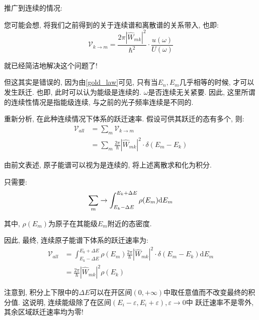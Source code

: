\documentclass[a4paper, 11pt]{article}
\begin{document}
\begin{spacing}{1.2}
          推广到连续的情况:
          \par
          您可能会想, 将我们之前得到的关于连续谱和离散谱的关系带入, 也即:
          \begin{equation}
            \mathcal{V}_{k\to{}m} = \frac{2\pi|\hat{W}_{mk}|^2}{\hbar^2}\cdot\frac{u(\omega)}{U(\omega)}
          \end{equation}
          
          就已经简洁地解决这个问题了!

          但这其实是错误的, 因为由\eqref{gold_law}可见, 只有当$E_n, E_m$几乎相等的时候, 才可以发生跃迁.
          也即, 此时可以认为能级是连续的. $\omega$是否连续无关紧要. 因此, 这里所谓的连续性情况是指能级连续, 
          与之前的光子频率连续是不同的.

          重新分析, 在此种连续情况下体系的跃迁速率.
          假设可供其跃迁的态有多个, 则:
          \begin{equation}
            \begin{aligned}
              \mathcal{V}_{all} &= \sum_m \mathcal{V}_{k\to{}m}\\
                                &= \sum_m \frac{2\pi}{\hbar}|\hat{W}_{mk}|^2\cdot\delta(E_m-E_k)
            \end{aligned} 
          \end{equation}

          由前文表述, 原子能谱可以视为是连续的, 将上述离散求和化为积分.
          \par
          只需要:
          \begin{equation}
            \sum_m \to \int_{E_k-\Delta{}E}^{E_k+\Delta{}E}\rho(E_m)\mathrm{d}E_m\notag
          \end{equation}

          其中, $\rho(E_m)$为原子在其能级$E_m$附近的态密度.

          因此, 最终, 连续原子能谱下体系的跃迁速率为:
          \begin{equation}
            \begin{aligned}
              \mathcal{V}_{all} &= \int_{E_k-\Delta{}E}^{E_k+\Delta{}E}\rho(E_m)
              \frac{2\pi}{\hbar}|\hat{W}_{mk}|^2\cdot\delta(E_m-E_k)\mathrm{d}E_m\\
                                &= \frac{2\pi}{\hbar}|\hat{W}_{mk}|^2\rho(E_k)
            \end{aligned}
          \end{equation}

          注意到, 积分上下限中的$\Delta{}E$可以在开区间$(0, +\infty)$中取任意值而不改变最终的积分值.
          这说明, 连续能级除了在区间$(E_i-\varepsilon, E_i+\varepsilon), \varepsilon\to0$中
          跃迁速率不是零外, 其余区域跃迁速率均为零!


\end{spacing}
\end{document}
